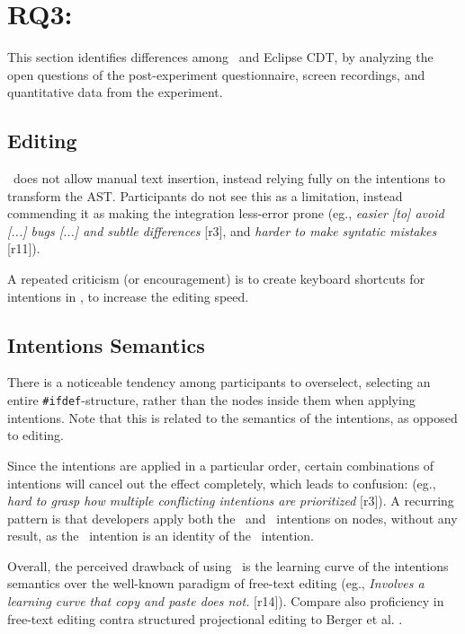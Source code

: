 \section{RQ3: \RQC}
This section identifies differences among \tooln~and Eclipse CDT, by analyzing the open questions of the post-experiment questionnaire, screen recordings, and quantitative data from the experiment. 

\subsection{Editing}
\tooln~does not allow manual text insertion, instead relying fully on the intentions to transform the AST. Participants do not see this as a limitation, instead commending it as making the integration less-error prone (eg., \textit{\bc easier [to] avoid [...] bugs [...] and subtle differences\ec} [r3], and \textit{\bc harder to make syntatic mistakes\ec} [r11]).

A repeated criticism (or encouragement) is to create keyboard shortcuts for intentions in \tooln, to increase the editing speed.


\subsection{Intentions Semantics}
There is a noticeable tendency among participants to overselect, selecting an entire \texttt{\#ifdef}-structure, rather than the nodes inside them when applying intentions. Note that this is related to the semantics of the intentions, as opposed to editing.

Since the intentions are applied in a particular order, certain combinations of intentions will cancel out the effect completely, which leads to confusion: (eg., \textit{\bc hard to grasp how multiple conflicting intentions are prioritized\ec} [r3]). A recurring pattern is that developers apply both the \keep~and \keepasf~intentions on nodes, without any result, as the \keep~intention is an identity of the \keepasf~intention.

Overall, the perceived drawback of using \tooln~is the learning curve of the intentions semantics over the well-known paradigm of free-text editing (eg., \textit{\bc Involves a learning curve that copy and paste does not.\ec} [r14]). Compare also proficiency in free-text editing contra structured projectional editing to Berger et al. \cite{berger2016mps}.

